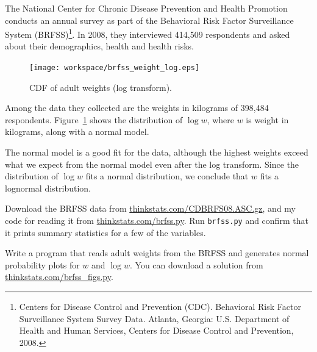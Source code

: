 \documentclass[12pt]{book}
\begin{document}
The National Center for Chronic Disease
Prevention and Health Promotion conducts an annual survey as part of
the Behavioral Risk Factor Surveillance System
(BRFSS)\footnote{Centers for Disease Control and Prevention
  (CDC). Behavioral Risk Factor Surveillance System Survey
  Data. Atlanta, Georgia: U.S. Department of Health and Human
  Services, Centers for Disease Control and Prevention, 2008.}.  In
2008, they interviewed 414,509 respondents and asked about their
demographics, health and health risks.

\begin{figure}
\centerline{
\texttt{[image: workspace/brfss\_weight\_log.eps]}
}
\caption{CDF of adult weights (log
  transform).}
\label{brfss_weight_log}
\end{figure}

Among the data they collected are the weights in kilograms of
398,484 respondents.
Figure~\ref{brfss_weight_log} shows the distribution
of $\log w$, where $w$ is weight in kilograms, along with a normal
model.

The normal model is a good fit for the data, although the highest
weights exceed what we expect from the normal model even after the log
transform.  Since the distribution of $\log w$ fits a normal distribution, we
conclude that $w$ fits a lognormal distribution.






\begin{ex}

Download the BRFSS data from 
\url{thinkstats.com/CDBRFS08.ASC.gz}, and my code for reading it
from
\url{thinkstats.com/brfss.py}.  Run {\tt brfss.py} and confirm that
it prints summary statistics for a few of the variables.

Write a program that reads adult weights from the BRFSS and
generates normal probability plots for $w$ and $\log w$.  You can
download a solution from \url{thinkstats.com/brfss_figs.py}.

\end{ex}
\end{document}
